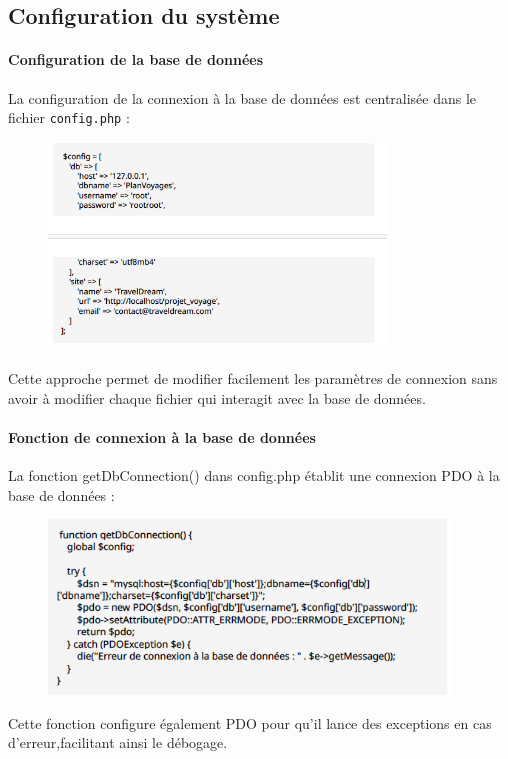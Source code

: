 \documentclass[a4paper,12pt]{article}
\begin{document}
\vspace{0.5em}
\subsection{Configuration du système}

\paragraph{Configuration de la base de données}
La configuration de la connexion à la base de données est centralisée dans le fichier \texttt{config.php} :
\begin{figure}[H]
    \centering
    \includegraphics[width=0.8\textwidth]{capture1.png}
\end{figure}
Cette approche permet de modifier facilement les paramètres de connexion sans avoir à
modifier chaque fichier qui interagit avec la base de données.

\paragraph{Fonction de connexion à la base de données}
La fonction getDbConnection() dans config.php établit une connexion PDO à la base de données :
\begin{figure}[H]
  \centering
  \includegraphics[width=0.95\textwidth]{capture2.png}
\end{figure}
Cette fonction configure également PDO pour qu'il lance des exceptions en cas d'erreur,facilitant ainsi le débogage.
\end{document}
